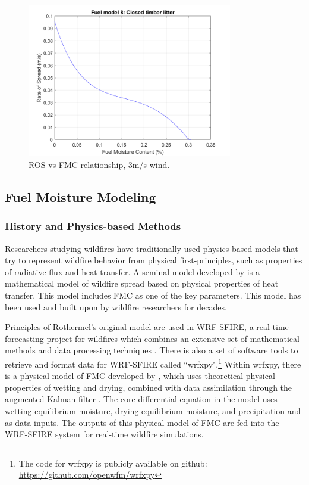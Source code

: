 \documentclass[11pt]{article}%
\begin{document}
\begin{figure}[p]
    \centering
    \includegraphics[width=0.8\textwidth]{images/fuel8_ros_fm_3wind.png}
    \caption{ROS vs FMC relationship, 3m/s wind.}
    \label{fig:fmc_ros_3wind}
\end{figure}

\subsection{Fuel Moisture Modeling}

\subsubsection{History and Physics-based Methods}
\hfill

Researchers studying wildfires have traditionally used physics-based models that try to represent wildfire behavior from physical first-principles, such as properties of radiative flux and heat transfer. A seminal model developed by \cite{Rothermel-1972-MMP} is a mathematical model of wildfire spread based on physical properties of heat transfer. This model includes FMC as one of the key parameters. This model has been used and built upon by wildfire researchers for decades. 

Principles of Rothermel's original model are used in WRF-SFIRE, a real-time forecasting project for wildfires which combines an extensive set of mathematical methods and data processing techniques \citep{OpenWFM-2024-HTD}. There is also a set of software tools to retrieve and format data for WRF-SFIRE called ``wrfxpy".\footnote{The code for wrfxpy is publicly available on github: \url{https://github.com/openwfm/wrfxpy}} Within wrfxpy, there is a physical model of FMC developed by \citet{Mandel-2014-RAA}, which uses theoretical physical properties of wetting and drying, combined with data assimilation through the augmented Kalman filter \citep{Vejmelka-2016-DAD}. The core differential equation in the model uses wetting equilibrium moisture, drying equilibrium moisture, and precipitation and as data inputs. The outputs of this physical model of FMC are fed into the WRF-SFIRE system for real-time wildfire simulations.
\end{document}
